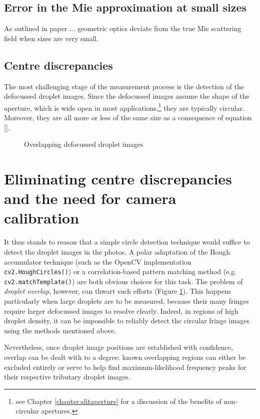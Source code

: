 \documentclass[11.5pt]{book}
\begin{document}
\subsection{Error in the Mie approximation at small sizes}
\label{sec:mie-error}
As outlined in paper ... geometric optics deviate from the true Mie scattering
field when sizes are very small.

\subsection{Centre discrepancies}
The most challenging stage of the measurement process is the detection of the
defocussed droplet images. Since the defocussed images assume the shape of the
aperture, which is wide open in most applications,\footnote{see Chapter
\ref{chapter:slitaperture} for a discussion of the benefits of non-circular
apertures.} they are typically circular. Moreover, they are all more or less of
the same size as a consequence of equation \eqref{}.

\begin{figure}
\centering
\caption{Overlapping defocussed droplet images}
\label{fig:droplet-overlap}
\end{figure}

\section{Eliminating centre discrepancies and the need for camera calibration}
It thus stands to reason that a simple circle detection technique would suffice
to detect the droplet images in the photos. A polar adaptation of the Hough
accumulator technique (such as the OpenCV implementation
\texttt{cv2.HoughCircles()}) or a correlation-based pattern matching method
(e.g. \texttt{cv2.matchTemplate()}) are both obvious choices for this task.  The
problem of \emph{droplet overlap}, however, can thwart such efforts (Figure
\ref{fig:droplet-overlap}). This happens particularly when large droplets are to
be measured, because their many fringes require larger defocussed images to
resolve clearly. Indeed, in regions of high droplet density, it can be impossible
to reliably detect the circular fringe images using the methods mentioned above.

Nevertheless, once droplet image positions are established with confidence, overlap can be
dealt with to a degree: known overlapping regions can either be excluded
entirely or serve to help find maximum-likelihood frequency peaks for their
respective tributary droplet images.
\end{document}
